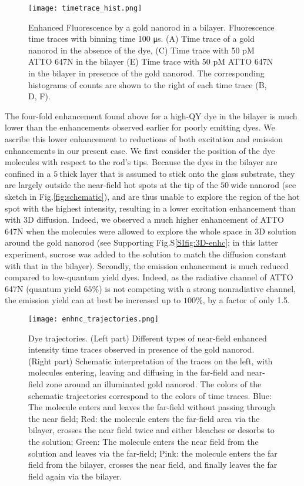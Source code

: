 \begin{figure}
	\centering
	\texttt{[image: timetrace\_hist.png]}
	\caption{Enhanced Fluorescence by a gold nanorod in a bilayer. Fluorescence time traces with binning time 100 μs. (A) Time trace of a gold nanorod in the absence of the dye, (C) Time trace with 50 pM ATTO 647N in the bilayer (E) Time trace with 50 pM ATTO 647N in the bilayer in presence of the gold nanorod. The corresponding histograms of counts are shown to the right of each time trace (B, D, F).}
	\label{fig:timetrace_hist}
\end{figure}
The four-fold enhancement found above for a high-QY dye in the bilayer is much lower than the enhancements observed earlier for poorly emitting dyes.\cite{yuan2013thousandfold} We ascribe this lower enhancement to reductions of both excitation and emission enhancements in our present case. We first consider the position of the dye molecules with respect to the rod’s tips. Because the dyes in the bilayer are confined in a $5~$\nm thick layer that is assumed to stick onto the glass substrate, they are largely outside the near-field hot spots at the tip of the $50~$\nm wide nanorod (see sketch in Fig.\ref{fig:schematic}), and are thus unable to explore the region of the hot spot with the highest intensity, resulting in a lower excitation enhancement than with 3D diffusion. Indeed, we observed a much higher enhancement of ATTO 647N when the molecules were allowed to explore the whole space in 3D solution around the gold nanorod (see Supporting Fig.S\ref{SIfig:3D-enhc}; in this latter experiment, sucrose was added to the solution to match the diffusion constant with that in the bilayer). Secondly, the emission enhancement is much reduced compared to low-quantum yield dyes. Indeed, as the radiative channel of ATTO 647N (quantum yield $65$\%) is not competing with a strong nonradiative channel, the emission yield can at best be increased up to $100$\%, by a factor of only 1.5.\cite{khatua2014resonant}\\
\begin{figure}
	\centering
	\texttt{[image: enhnc\_trajectories.png]}
	\caption{Dye trajectories. (Left part) Different types of near-field enhanced intensity time traces observed in presence of the gold nanorod. (Right part) Schematic interpretation of the traces on the left, with molecules entering, leaving and diffusing in the far-field and near-field zone around an illuminated gold nanorod. The colors of the schematic trajectories correspond to the colors of time traces. Blue: The molecule enters and leaves the far-field without passing through the near field; Red: the molecule enters the far-field area via the bilayer, crosses the near field twice and either bleaches or desorbs to the solution; Green: The molecule enters the near field from the solution and leaves via the far-field; Pink: the molecule enters the far field from the bilayer, crosses the near field, and finally leaves the far field again via the bilayer.}
	\label{fig:enhnc_trajectories}
\end{figure}
